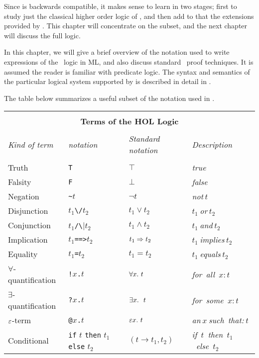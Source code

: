 Since \HOLW{} is backwards compatible, it makes sense to learn \HOLW{} in
two stages; first to study just the classical higher order logic of \HOL,
and then add to that the extensions provided by \HOLW.  This chapter will
concentrate on the \HOL{} subset,
and the next chapter will discuss the full \HOLW{} logic.

In this chapter, we will give a brief overview of the notation used to
write expressions of the \HOL\ logic in ML, and also discuss standard
\HOL\ proof techniques. It is assumed the reader is familiar with
predicate logic.  The syntax and semantics of the particular logical
system supported by \HOLW{} is described in detail in \DESCRIPTION.


The table below summarizes a useful subset of the notation used in
\HOL.

\begin{center}
\begin{tabular}{|l|l|l|l|} \hline
\multicolumn{4}{|c|}{ } \\
\multicolumn{4}{|c|}{\bf Terms of the HOL Logic} \\
\multicolumn{4}{|c|}{ } \\
{\it Kind of term} & {\it \HOL{} notation} &
{\it Standard notation} &
{\it Description} \\ \hline
 & & & \\
Truth & {\small\verb|T|} & $\top$ & {\it true}\\ \hline
Falsity & {\small\verb|F|} & $\bot$ & {\it false}\\ \hline
Negation & {\small\verb|~|}$t$ & $\neg t$ & {\it not}$\ t$\\ \hline
Disjunction & $t_1${\small\verb|\/|}$t_2$ & $t_1\vee t_2$ &
$t_1\ ${\it or}$\ t_2$ \\ \hline
Conjunction & $t_1${\small\verb|/\|}$t_2$ & $t_1\wedge t_2$ &
$t_1\ ${\it and}$\ t_2$ \\ \hline
Implication & $t_1${\small\verb|==>|}$t_2$ & $t_1\Rightarrow t_2$ &
$t_1\ ${\it implies}$\ t_2$ \\ \hline
Equality & $t_1${\small\verb|=|}$t_2$ & $t_1 = t_2$ &
$t_1\ ${\it equals}$\ t_2$ \\ \hline
$\forall$-quantification & {\small\verb|!|}$x${\small\verb|.|}$t$ &
$\forall x.\ t$ & {\it for\ all\ }$x: t$ \\ \hline
$\exists$-quantification & {\small\verb|?|}$x${\small\verb|.|}$t$ &
$\equant{x}\ t$ & {\it for\ some\ }$x: t$ \\ \hline
$\varepsilon$-term & {\small\verb|@|}$x${\small\verb|.|}$t$ &
$\varepsilon x.\ t$ & {\it an}$\ x\ ${\it such\ that:}$\ t$ \\ \hline
Conditional & {\small\verb|if|} $t$ {\small\verb|then|} $t_1$
              {\small\verb|else|} $t_2$ &
$(t\rightarrow t_1, t_2)$ & {\it if\ }$t${\it \ then\ }$t_1${\it\ else\ }$t_2$
 \\ \hline
\end{tabular}
\end{center}\label{logic-table}

